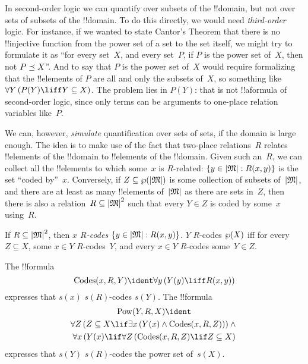 \documentclass[../../../include/open-logic-section]{subfiles}
\begin{document}


\begin{explain}
In second-order logic we can quantify over subsets of the !!{domain},
but not over sets of subsets of the !!{domain}. To do this directly,
we would need \emph{third-order} logic.  For instance, if we wanted to
state Cantor's Theorem that there is no !!{injective} function from
the power set of a set to the set itself, we might try to formulate it
as ``for every set~$X$, and every set~$P$, if $P$ is the power set
of~$X$, then not $P \preceq X$''. And to say that $P$ is the power set
of~$X$ would require formalizing that the !!{element}s of $P$ are all
and only the subsets of~$X$, so something like $\lforall[Y][(P(Y)
  \liff Y \subseteq X)]$. The problem lies in $P(Y)$: that is not
!!a{formula} of second-order logic, since only terms can be arguments
to one-place relation variables like~$P$.

We can, however, \emph{simulate} quantification over sets of sets, if
the domain is large enough.  The idea is to make use of the fact that
two-place relations~$R$ relates !!{element}s of the !!{domain} to
!!{element}s of the !!{domain}. Given such an~$R$, we can collect all
the !!{element}s to which some~$x$ is $R$-related: $\Setabs{y \in
  \Domain{M}}{R(x,y)}$ is the set ``coded by''~$x$.  Conversely, if
$Z \subseteq \Pow{\Domain{M}}$ is some collection of subsets
of~$\Domain{M}$, and there are at least as many !!{element}s
of~$\Domain{M}$ as there are sets in~$Z$, then there is also a
relation~$R \subseteq \Domain{M}^2$ such that every $Y \in Z$ is coded
by some~$x$ using~$R$.
\end{explain}

\begin{defn}
If $R \subseteq \Domain{M}^2$, then \emph{$x$ $R$-codes} $\Setabs{y
  \in \Domain{M}}{R(x, y)}$. $Y$ $R$-codes $\wp(X)$ iff for every $Z
\subseteq X$, some $x \in Y$ $R$-codes~$Y$, and every $x \in Y$
$R$-codes some~$Y \in Z$.
\end{defn}

\begin{prop}
  The !!{formula}
  \[
  \fn{Codes}(x, R, Y) \ident \lforall[y][(Y(y) \liff
    R(x, y))]
  \]
  expresses that $s(x)$ $s(R)$-codes $s(Y)$.  The
!!{formula} 
\begin{multline*}
  \fn{Pow}(Y, R, X) \ident \\
  \lforall[Z][(Z \subseteq X \lif \lexists[x][(Y(x) \land
    \fn{Codes}(x, R, Z))])] \land {} \\ \lforall[x][(Y(x) \lif
  \lforall[Z][(\fn{Codes}(x, R, Z) \lif Z \subseteq X)]]
\end{multline*}
expresses that $s(Y)$ $s(R)$-codes the power set of~$s(X)$.
\end{prop}
\end{document}
